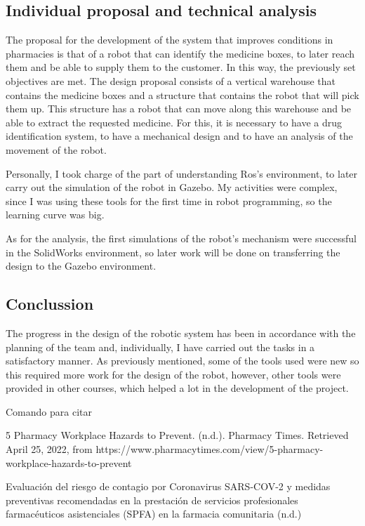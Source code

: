 \documentclass{article}
\begin{document}
\begin{multicols}{2}
\subsection*{Individual proposal and technical analysis}\label{subseccion}      
The proposal for the development of the system that improves conditions in pharmacies is that of a robot that can identify the medicine boxes, to later reach them and be able to supply them to the customer. In this way, the previously set objectives are met.
The design proposal consists of a vertical warehouse that contains the medicine boxes and a structure that contains the robot that will pick them up.
This structure has a robot that can move along this warehouse and be able to extract the requested medicine.
For this, it is necessary to have a drug identification system, to have a mechanical design and to have an analysis of the movement of the robot.

Personally, I took charge of the part of understanding Ros's environment, to later carry out the simulation of the robot in Gazebo. My activities were complex, since I was using these tools for the first time in robot programming, so the learning curve was big.

As for the analysis, the first simulations of the robot's mechanism were successful in the SolidWorks environment, so later work will be done on transferring the design to the Gazebo environment.

\subsection*{Conclussion}\label{subseccion}      
The progress in the design of the robotic system has been in accordance with the planning of the team and, individually, I have carried out the tasks in a satisfactory manner. As previously mentioned, some of the tools used were new so this required more work for the design of the robot, however, other tools were provided in other courses, which helped a lot in the development of the project.




Comando para citar  \cite{Johana}

\begin{thebibliography}{9}		
5 Pharmacy Workplace Hazards to Prevent. (n.d.). Pharmacy Times. Retrieved April 25, 2022, from https://www.pharmacytimes.com/view/5-pharmacy-workplace-hazards-to-prevent 

Evaluación del riesgo de contagio por Coronavirus SARS-COV-2 y medidas preventivas recomendadas en la prestación de servicios profesionales farmacéuticos asistenciales (SPFA) en la farmacia comunitaria (n.d.) 

   
\end{thebibliography}

\end{multicols}
\end{document}
